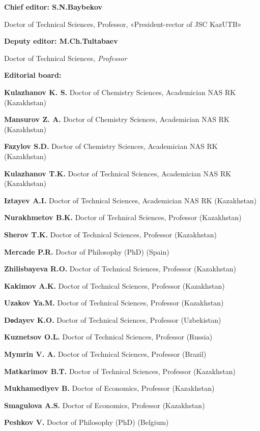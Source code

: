 {\small
\begin{center}
\textbf{Chief editor: S.N.Baybekov}

Doctor of Technical Sciences, Professor, «President-rector of JSC
KazUTB»

\textbf{Deputy editor: M.Ch.Tultabaev}

Doctor of Technical Sciences\emph{, Professor}

\textbf{Editorial board:}
\end{center}

\textbf{Kulazhanov K. S.} Doctor of Chemistry Sciences, Academician NAS
RK (Kazakhstan)

\textbf{Mansurov Z. A.} Doctor of Chemistry Sciences, Academician NAS RK
(Kazakhstan)

\textbf{Fazylov S.D.} Doctor of Chemistry Sciences, Academician NAS RK
(Kazakhstan)

\textbf{Kulazhanov T.K.} Doctor of Technical Sciences, Academician NAS
RK (Kazakhstan)

\textbf{Iztayev A.I.} Doctor of Technical Sciences, Academician NAS RK
(Kazakhstan)

\textbf{Nurakhmetov B.K.} Doctor of Technical Sciences, Professor
(Kazakhstan)

\textbf{Sherov T.K.} Doctor of Technical Sciences, Professor
(Kazakhstan)

\textbf{Mercade P.R.} Doctor of Philosophy (PhD) (Spain)

\textbf{Zhilisbayeva R.O.} Doctor of Technical Sciences, Professor
(Kazakhstan)

\textbf{Kakimov A.K.} Doctor of Technical Sciences, Professor
(Kazakhstan)

\textbf{Uzakov Ya.M.} Doctor of Technical Sciences, Professor
(Kazakhstan)

\textbf{Dоdayev K.O.} Doctor of Technical Sciences, Professor
(Uzbekistan)

\textbf{Kuznetsov O.L.} Doctor of Technical Sciences, Professor (Russia)

\textbf{Mymrin V. A.} Doctor of Technical Sciences, Professor (Brazil)

\textbf{Matkarimov B.T.} Doctor of Technical Sciences, Professor
(Kazakhstan)

\textbf{Mukhamediyev B.} Doctor of Economics, Professor (Kazakhstan)

\textbf{Smagulova A.S.} Doctor of Economics, Professor (Kazakhstan)

\textbf{Peshkov V.} Doctor of Philosophy (PhD) (Belgium)

}
